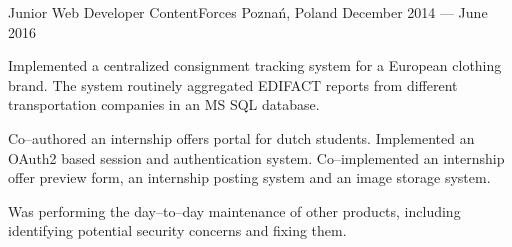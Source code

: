 \documentclass[11pt, a4paper]{awesome-cv}
\begin{document}
\begin{cventries}
  \cventry
    {Junior Web Developer} %
    {ContentForces} %
    {Poznań, Poland} %
    {December 2014 --- June 2016} %
    {
      \begin{cvitems} %
        \item {Implemented a centralized consignment tracking system for a European clothing brand. The system routinely aggregated EDIFACT reports from different transportation companies in an MS SQL database.}
        \item {Co--authored an internship offers portal for dutch students. Implemented an OAuth2 based session and authentication system. Co--implemented an internship offer preview form, an internship posting system and an image storage system.}
        \item {Was performing the day--to--day maintenance of other products, including identifying potential security concerns and fixing them.}
      \end{cvitems}
    }
\end{cventries}


\begin{cvskills}
\end{cvskills}
\end{document}

